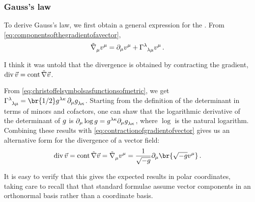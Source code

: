 \subsubsection{Gauss's law}
%
 To derive Gauss's law, we first obtain a general expression for the . From \cref{eq:componentsofthegradientofavector},
%
\begin{equation}\label{eq:contractionofgradientofvector}
  \tgradcov\mu\tvec v\mu = \ipd\mu\tvec v\mu + \tchris\lambda\lambda\mu\tvec v\mu\,.
\end{equation}

 I think it was untold that the divergence is obtained by contracting the gradient, $\operatorname{div}\vec v = \operatorname{cont}\tilde{\nabla}\vec v$.

From \cref{eq:christoffelsymbolsasfunctionsofmetric}, we get $\tchris\lambda\lambda\mu = \br{1/2}\tinvmet\lambda\kappa\,\ipd\mu\tmetric\lambda\kappa$. Starting from the definition of the determinant in terms of minors and cofactors, one can shaw that the logarithmic derivative of the determinant of $g$ is $\ipd\mu\log\metric = \tinvmet\lambda\kappa\ipd\mu\tmetric\lambda\kappa$, where $\log$ is the natural logarithm. Combining these results with \cref{eq:contractionofgradientofvector} gives us an alternative form for the divergence of a vector field:
%
\begin{equation}\label{eq:divergenceofavector}
  \div\vec v = \cont\gradcov\vec v
             = \tgradcov\mu\tvec v\mu
             = \dfrac{1}{\sqrt{-\metric}}\ipd\mu\br{\sqrt{-\metric}\tvec v\mu}\,.
\end{equation}

 It is easy to verify that this gives the expected results in polar coordinates, taking care to recall that that standard formulae assume vector components in an orthonormal basis rather than a coordinate basis.

